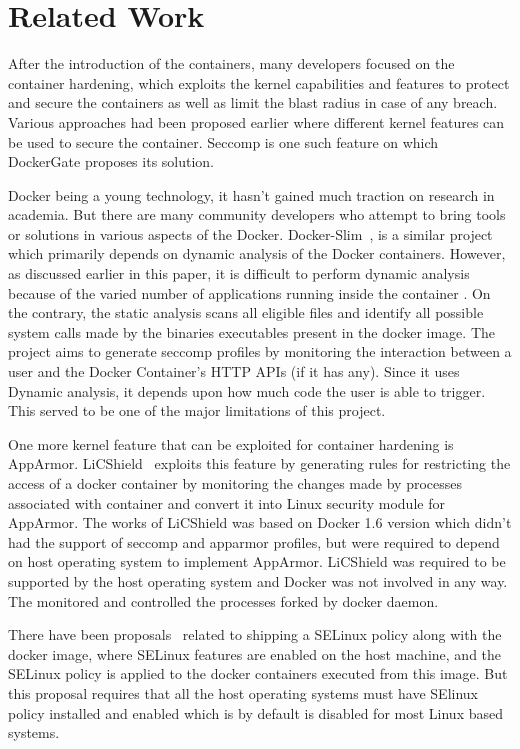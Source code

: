 \section{Related Work}
\label{sec:relwork}

After the introduction of the containers, many developers focused on the container hardening, which exploits the kernel capabilities and features to protect and secure the containers as well as limit the blast radius in case of any breach. Various approaches had been proposed earlier where different kernel features can be used to secure the container. Seccomp is one such feature on which DockerGate proposes its solution.  

Docker being a young technology, it hasn't gained much traction on research in academia. But there are many community developers who attempt to bring tools or solutions in various aspects of the Docker. Docker-Slim~\cite{dockerslim}, is a similar project which primarily depends on dynamic analysis of the Docker containers. However, as discussed earlier in this paper, it is difficult to perform dynamic analysis because of the varied number of applications running inside the container . On the contrary, the static analysis scans all eligible files and  identify all possible system calls made by the binaries executables present in the docker image. The project aims to generate seccomp profiles by monitoring the interaction between a user and the Docker Container's HTTP APIs (if it has any). Since it uses Dynamic analysis, it depends upon how much code the user is able to trigger. This served to be one of the major limitations of this project.

One more kernel feature that can be exploited for container hardening is AppArmor. LiCShield~\cite{mattetti} exploits this feature by generating rules for restricting the access of a docker container by monitoring the changes made by processes associated with container and convert it into Linux security module for AppArmor. The works of LiCShield was based on Docker 1.6 version which didn’t had the support of seccomp and apparmor profiles, but were required to depend on host operating system to implement AppArmor. LiCShield was required to be supported by the host operating system and Docker was not involved in any way. The monitored and controlled the processes forked by docker daemon.

There have been proposals~\cite{dockerpolicymodules} related to shipping a SELinux policy along with the docker image, where SELinux features are enabled on the host machine, and the SELinux policy is applied to the docker containers executed from this image. But this proposal requires that all the host operating systems must have SElinux policy installed and enabled which is by default is disabled for most Linux based systems.

